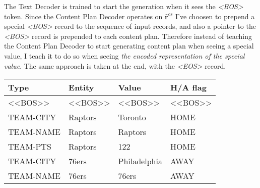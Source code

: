 The Text Decoder is trained to start the generation when it sees the \emph{\textless BOS\textgreater} token. Since the Content Plan Decoder operates on $\hat{\mathbf{r}}^{cs}$ I've choosen to prepend a special \emph{\textless BOS\textgreater} record to the sequence of input records, and also a pointer to the \emph{\textless BOS\textgreater} record is prepended to each content plan. Therefore instead of teaching the Content Plan Decoder to start generating content plan when seeing a special value, I teach it to do so when seeing \emph{the encoded representation of the special value}. The same approach is taken at the end, with the \emph{\textless EOS\textgreater} record.

\begin{table}
    \centering \small
    \begin{tabular}{llll}
        \toprule
        \textbf{Type} & \textbf{Entity} & \textbf{Value} & \textbf{H/A flag} \\                  
        \midrule
        \textless{}\textless{}BOS\textgreater{}\textgreater{} & \textless{}\textless{}BOS\textgreater{}\textgreater{} & \textless{}\textless{}BOS\textgreater{}\textgreater{} & \textless{}\textless{}BOS\textgreater{}\textgreater{} \\
        TEAM-CITY                                             & Raptors                                               & Toronto                                               & HOME                                                  \\
        TEAM-NAME                                             & Raptors                                               & Raptors                                               & HOME                                                  \\
        TEAM-PTS                                              & Raptors                                               & 122                                                   & HOME                                                  \\
        TEAM-CITY                                             & 76ers                                                 & Philadelphia                                          & AWAY                                                  \\
        TEAM-NAME                                             & 76ers                                                 & 76ers                                                 & AWAY                                                  \\

\end{tabular}
\end{table}
